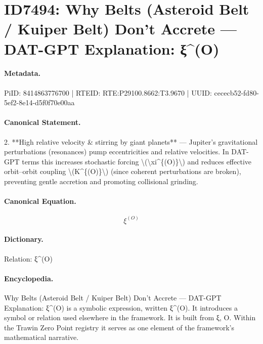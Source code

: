 \section*{ID7494: Why Belts (Asteroid Belt / Kuiper Belt) Don’t Accrete — DAT-GPT Explanation: ξ\textasciicircum{}(O)}
\paragraph{Metadata.}
PiID: 8414863776700 | RTEID: RTE:P29100.8662:T3.9670 | UUID: cececb52-fd80-5ef2-8e14-d5f0f70e00aa

\paragraph{Canonical Statement.}
2. **High relative velocity \& stirring by giant planets** — Jupiter’s gravitational perturbations (resonances) pump eccentricities and relative velocities. In DAT-GPT terms this increases stochastic forcing \textbackslash{}(\textbackslash{}xi\textasciicircum{}\{(O)\}\textbackslash{}) and reduces effective orbit–orbit coupling \textbackslash{}(K\textasciicircum{}\{(O)\}\textbackslash{}) (since coherent perturbations are broken), preventing gentle accretion and promoting collisional grinding.

\paragraph{Canonical Equation.}
\[
\xi^{(O)}
\]

\paragraph{Dictionary.}
Relation: ξ\textasciicircum{}(O)

\paragraph{Encyclopedia.}
Why Belts (Asteroid Belt / Kuiper Belt) Don’t Accrete — DAT-GPT Explanation: ξ\textasciicircum{}(O) is a symbolic expression, written ξ\textasciicircum{}(O). It introduces a symbol or relation used elsewhere in the framework. It is built from ξ, O. Within the Trawin Zero Point registry it serves as one element of the framework's mathematical narrative.
